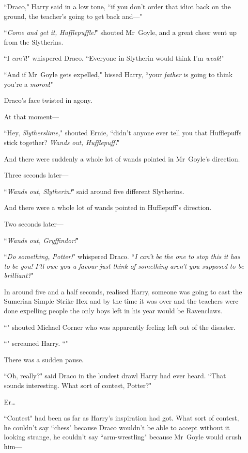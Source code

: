``Draco," Harry said in a low tone, ``if you don't order that idiot back on the ground, the teacher's going to get back and—"

``\emph{Come and get it, Hufflepuffle!}" shouted Mr~Goyle, and a great cheer went up from the Slytherins.

``I \emph{can't}!" whispered Draco. ``Everyone in Slytherin would think I'm \emph{weak}!"

``And if Mr~Goyle gets expelled," hissed Harry, ``your \emph{father} is going to think you're a \emph{moron}!"

Draco's face twisted in agony.

At that moment—

``Hey, \emph{Slytherslime}," shouted Ernie, ``didn't anyone ever tell you that Hufflepuffs stick together? \emph{Wands out, Hufflepuff!}"

And there were suddenly a whole lot of wands pointed in Mr~Goyle's direction.

Three seconds later—

``\emph{Wands out, Slytherin!}" said around five different Slytherins.

And there were a whole lot of wands pointed in Hufflepuff's direction.

Two seconds later—

``\emph{Wands out, Gryffindor!}"

``\emph{Do something, Potter!}" whispered Draco. ``\emph{I can't be the one to stop this it has to be you! I'll owe you a favour just think of something aren't you supposed to be brilliant?}"

In around five and a half seconds, realised Harry, someone was going to cast the Sumerian Simple Strike Hex and by the time it was over and the teachers were done expelling people the only boys left in his year would be Ravenclaws.

``" shouted Michael Corner who was apparently feeling left out of the disaster.

``" screamed Harry. ``"

There was a sudden pause.

``Oh, really?" said Draco in the loudest drawl Harry had ever heard. ``That sounds interesting. What sort of contest, Potter?"

Er{\ldots}

``Contest" had been as far as Harry's inspiration had got. What sort of contest, he couldn't say ``chess" because Draco wouldn't be able to accept without it looking strange, he couldn't say ``arm-wrestling" because Mr~Goyle would crush him—

